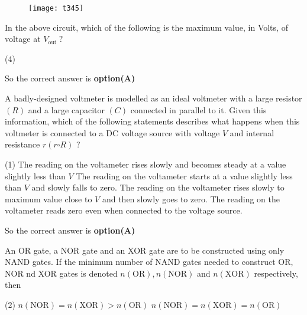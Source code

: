 \begin{questions}
\begin{minipage}{\textwidth}
	\question \begin{figure}[H]
		\centering
		\texttt{[image: t345]}
	\end{figure}
	In the above circuit, which of the following is the maximum value, in Volts, of voltage at $V_{\text {out }} ?$
\end{minipage}
\begin{tasks}(4)
\end{tasks}
\begin{answer}
	So the correct answer is \textbf{option(A)}
\end{answer}
\begin{minipage}{\textwidth}
	\question A badly-designed voltmeter is modelled as an ideal voltmeter with a large resistor $(R)$ and a large capacitor $(C)$ connected in parallel to it. Given this information, which of the following statements describes what happens when this voltmeter is connected to a DC voltage source with voltage $V$ and internal resistance $r(r \square R)$ ?
\end{minipage}
\begin{tasks}(1)
	\task[\textbf{A.}] The reading on the voltameter rises slowly and becomes steady at a value slightly less than $V$
	\task[\textbf{B.}] The reading on the voltameter starts at a value slightly less than $V$ and slowly falls to zero.
	\task[\textbf{C.}] The reading on the voltameter rises slowly to maximum value close to $V$ and then slowly goes to zero.
	\task[\textbf{D.}]   The reading on the voltameter reads zero even when connected to the voltage source.
\end{tasks}
\begin{answer}
	So the correct answer is \textbf{option(A)}
\end{answer}
\begin{minipage}{\textwidth}
	\question An OR gate, a NOR gate and an XOR gate are to be constructed using only NAND gates. If the minimum number of NAND gates needed to construct OR, NOR nd XOR gates is denoted $n(\mathrm{OR}), n(\mathrm{NOR})$ and $n(\mathrm{XOR})$ respectively, then
\end{minipage}
\begin{tasks}(2)
	\task[\textbf{A.}] $n(\mathrm{NOR})=n(\mathrm{XOR})>n(\mathrm{OR})$
	\task[\textbf{B.}]   $n(\mathrm{NOR})=n(\mathrm{XOR})=n(\mathrm{OR})$

\end{tasks}
\end{questions}
